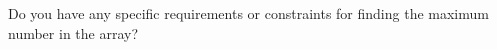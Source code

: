 \documentclass[preview]{standalone}
\begin{document}
Do you have any specific requirements or constraints for finding the maximum number in the array?\\
\end{document}
